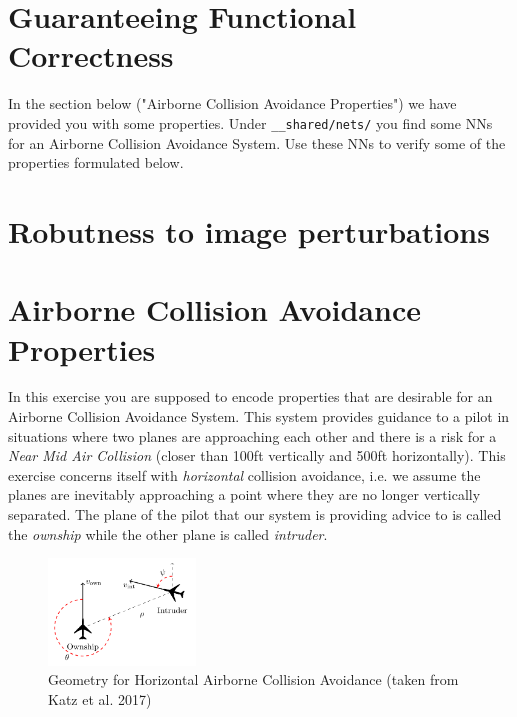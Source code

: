 \documentclass[11pt,fleqn]{article}
\begin{document}
\section*{Guaranteeing Functional Correctness}
In the section below ("Airborne Collision Avoidance Properties") we have provided you with some properties.
Under \texttt{\_\_shared/nets/} you find some NNs for an Airborne Collision Avoidance System.
Use these NNs to verify some of the properties formulated below.

\section*{Robutness to image perturbations}



\clearpage
\section*{Airborne Collision Avoidance Properties}

In this exercise you are supposed to encode properties that are desirable for an
Airborne Collision Avoidance System.
This system provides guidance to a pilot in situations where two planes are approaching each other and there is a risk for a \emph{Near Mid Air Collision} (closer than 100ft vertically and 500ft horizontally).
This exercise concerns itself with \emph{horizontal} collision avoidance, i.e. we assume the planes 
are inevitably approaching a point where they are no longer vertically separated.
The plane of the pilot that our system is providing advice to is called the \emph{ownship} while the other plane is called \emph{intruder}.


\begin{figure}
    \centering
    \includegraphics[width=0.35\textwidth]{figures/acas.png}
    \caption{Geometry for Horizontal Airborne Collision Avoidance (taken from Katz et al. 2017)}
    \label{fig:acas}
\end{figure}
\end{document}
